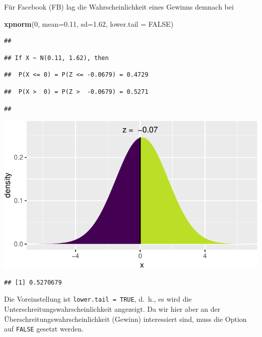 \documentclass[12pt,ngerman,paper=a4,pagesize,DIV=13]{scrreprt}
\newenvironment{Shaded}{\begin{snugshade}}{\end{snugshade}}
\newcommand{\DataTypeTok}[1]{\textcolor[rgb]{0.13,0.29,0.53}{#1}}
\newcommand{\DecValTok}[1]{\textcolor[rgb]{0.00,0.00,0.81}{#1}}
\newcommand{\FloatTok}[1]{\textcolor[rgb]{0.00,0.00,0.81}{#1}}
\newcommand{\KeywordTok}[1]{\textcolor[rgb]{0.13,0.29,0.53}{\textbf{#1}}}
\newcommand{\NormalTok}[1]{#1}
\newcommand{\OtherTok}[1]{\textcolor[rgb]{0.56,0.35,0.01}{#1}}
\begin{document}
Für Facebook (FB) lag die Wahrscheinlichkeit eines Gewinns demnach bei

\begin{Shaded}
\begin{Highlighting}[]
\KeywordTok{xpnorm}\NormalTok{(}\DecValTok{0}\NormalTok{, }\DataTypeTok{mean=}\FloatTok{0.11}\NormalTok{, }\DataTypeTok{sd=}\FloatTok{1.62}\NormalTok{, }\DataTypeTok{lower.tail =} \OtherTok{FALSE}\NormalTok{)}
\end{Highlighting}
\end{Shaded}

\begin{verbatim}
## 
\end{verbatim}

\begin{verbatim}
## If X ~ N(0.11, 1.62), then
\end{verbatim}

\begin{verbatim}
##  P(X <= 0) = P(Z <= -0.0679) = 0.4729
\end{verbatim}

\begin{verbatim}
##  P(X >  0) = P(Z >  -0.0679) = 0.5271
\end{verbatim}

\begin{verbatim}
## 
\end{verbatim}

\includegraphics{DatenerhebungStatistik-Uebung_files/figure-latex/unnamed-chunk-93-1.pdf}

\begin{verbatim}
## [1] 0.5270679
\end{verbatim}

Die Voreinstellung ist \texttt{lower.tail\ =\ TRUE}, d.~h., es wird die
Unterschreitungswahrscheinlichkeit angezeigt. Da wir hier aber an der
Überschreitungswahrscheinlichkeit (Gewinn) interessiert sind, muss die
Option auf \texttt{FALSE} gesetzt werden.
\end{document}
